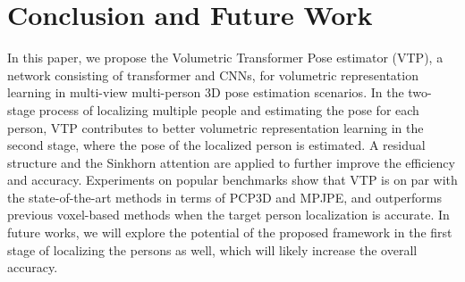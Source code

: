 \documentclass[lettersize,journal]{IEEEtran}
\begin{document}
\section{Conclusion and Future Work}
\par In this paper, we propose the Volumetric Transformer Pose estimator (VTP), a network consisting of transformer and CNNs, for volumetric representation learning in multi-view multi-person 3D pose estimation scenarios. In the two-stage process of localizing multiple people and estimating the pose for each person, VTP contributes to better volumetric representation learning in the second stage, where the pose of the localized person is estimated. A residual structure and the Sinkhorn attention are applied to further improve the efficiency and accuracy. Experiments on popular benchmarks show that VTP is on par with the state-of-the-art methods in terms of PCP3D and MPJPE, and outperforms previous voxel-based methods when the target person localization is accurate. In future works, we will explore the potential of the proposed framework in the first stage of localizing the persons as well, which will likely increase the overall accuracy.


\printbibliography










\vfill
\end{document}

